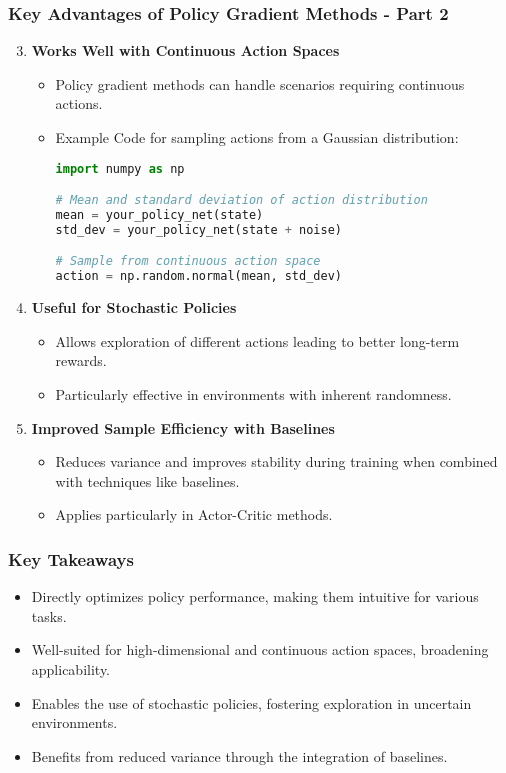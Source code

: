 \documentclass[aspectratio=169]{beamer}
\begin{document}
\begin{frame}[fragile]
    \frametitle{Key Advantages of Policy Gradient Methods - Part 2}
    \begin{enumerate}
        \setcounter{enumi}{2}
        \item \textbf{Works Well with Continuous Action Spaces}
        \begin{itemize}
            \item Policy gradient methods can handle scenarios requiring continuous actions.
            \item Example Code for sampling actions from a Gaussian distribution:
            \begin{lstlisting}[language=Python]
import numpy as np

# Mean and standard deviation of action distribution
mean = your_policy_net(state)
std_dev = your_policy_net(state + noise)

# Sample from continuous action space
action = np.random.normal(mean, std_dev)
            \end{lstlisting}
        \end{itemize}
        
        \item \textbf{Useful for Stochastic Policies}
        \begin{itemize}
            \item Allows exploration of different actions leading to better long-term rewards.
            \item Particularly effective in environments with inherent randomness.
        \end{itemize}

        \item \textbf{Improved Sample Efficiency with Baselines}
        \begin{itemize}
            \item Reduces variance and improves stability during training when combined with techniques like baselines.
            \item Applies particularly in Actor-Critic methods.
        \end{itemize}
    \end{enumerate}
\end{frame}

\begin{frame}[fragile]
    \frametitle{Key Takeaways}
    \begin{itemize}
        \item Directly optimizes policy performance, making them intuitive for various tasks.
        \item Well-suited for high-dimensional and continuous action spaces, broadening applicability.
        \item Enables the use of stochastic policies, fostering exploration in uncertain environments.
        \item Benefits from reduced variance through the integration of baselines.
    \end{itemize}
\end{frame}
\end{document}
